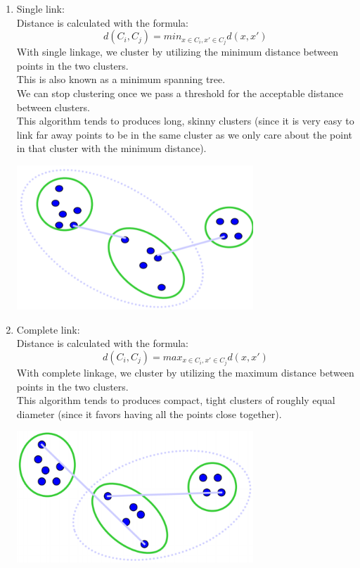 \documentclass{article}
\begin{document}
\begin{enumerate}
	\item Single link:\\
	Distance is calculated with the formula:
	\begin{equation}
	    d(C_i,C_j) = min_{x \in C_i,x' \in C_j}d(x,x')
    \end{equation}
    With single linkage, we cluster by utilizing the minimum distance between points in the two clusters.\\
    This is also known as a minimum spanning tree.\\
    We can stop clustering once we pass a threshold for the acceptable distance between clusters.\\
    This algorithm tends to produces long, skinny clusters (since it is very easy to link far away points to be in the same cluster as we only care about the point in that cluster with the minimum distance).
    \begin{center}
        \includegraphics[width=0.70\textwidth]{single.png}
    \end{center}

	\item Complete link:\\
	Distance is calculated with the formula:
	\begin{equation}
	    d(C_i,C_j) = max_{x \in C_i,x' \in C_j}d(x,x')
    \end{equation}
    With complete linkage, we cluster by utilizing the maximum distance between points in the two clusters.\\
    This algorithm tends to produces compact, tight clusters of roughly equal diameter (since it favors having all the points close together).
    \begin{center}
        \includegraphics[width=0.70\textwidth]{complete.png}
    \end{center}


\end{enumerate}
\end{document}
